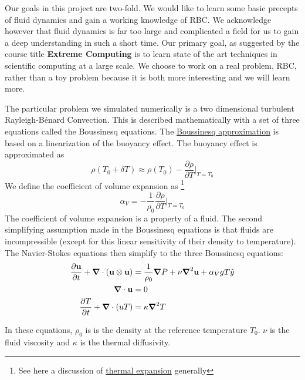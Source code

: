 \documentclass[11pt]{article} %
\newcommand{\uu}{\vectorbold{u}}
\begin{document}
Our goals in this project are two-fold.  
We would like to learn some basic precepts of fluid dynamics and gain a working knowledge of RBC.
We acknowledge however that fluid dynamics is far too large and complicated a field for us 
to gain a deep understanding in such a short time.
Our primary goal, as suggested by the course title \textbf{Extreme Computing}
is to learn state of the art techniques in scientific computing at a large scale.
We choose to work on a real problem, RBC, rather than a toy problem because
it is both more interesting and we will learn more.

The particular problem we simulated numerically is a two dimensional turbulent Rayleigh-B\'enard Convection.  
This is described mathematically with a set of three equations called the Boussinesq equations.
The \href{https://en.wikipedia.org/wiki/Boussinesq_approximation_(buoyancy)}{Boussinesq approximation} 
is based on a linearization of the buoyancy effect.
The buoyancy effect is approximated as 
$$ \rho(T_0 + \delta T) \approx \rho(T_0) - \frac{\partial \rho}{\partial T}\Bigr|_{T=T_0}$$
We define the coefficient of volume expansion as
\footnote{See here a discussion of  \href{https://en.wikipedia.org/wiki/Thermal_expansion}{thermal expansion} generally}
$$\alpha_V = -\frac{1}{\rho_0}\frac{\partial \rho}{\partial T}\Bigr|_{T=T_0}$$
The coefficient of volume expansion is a property of a fluid.
The second simplifying assumption made in the Boussinesq equations is that fluids are incompressible
(except for this linear sensitivity of their density to temperature).
The Navier-Stokes equations then simplify to the three Boussinesq equations:
\begin{align}
\frac{\partial \uu}{\partial t} + \grad \cdot (\uu \otimes \uu) &= \frac{1}{\rho_0} \grad P + \nu \grad^2 \uu + \alpha_V g T \hat{y} \\
\grad \cdot \uu &= 0 \\
\frac{\partial T}{\partial t} + \grad \cdot (uT) &= \kappa \grad^2 T
\end{align}

In these equations, $\rho_0$ is is the density at the reference temperature $T_0$.
$\nu$ is the fluid viscosity and $\kappa$ is the thermal diffusivity.
\end{document}

